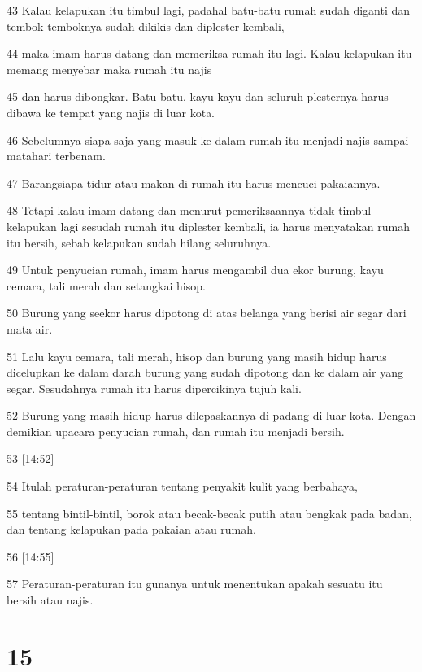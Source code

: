 \par 43 Kalau kelapukan itu timbul lagi, padahal batu-batu rumah sudah diganti dan tembok-temboknya sudah dikikis dan diplester kembali,
\par 44 maka imam harus datang dan memeriksa rumah itu lagi. Kalau kelapukan itu memang menyebar maka rumah itu najis
\par 45 dan harus dibongkar. Batu-batu, kayu-kayu dan seluruh plesternya harus dibawa ke tempat yang najis di luar kota.
\par 46 Sebelumnya siapa saja yang masuk ke dalam rumah itu menjadi najis sampai matahari terbenam.
\par 47 Barangsiapa tidur atau makan di rumah itu harus mencuci pakaiannya.
\par 48 Tetapi kalau imam datang dan menurut pemeriksaannya tidak timbul kelapukan lagi sesudah rumah itu diplester kembali, ia harus menyatakan rumah itu bersih, sebab kelapukan sudah hilang seluruhnya.
\par 49 Untuk penyucian rumah, imam harus mengambil dua ekor burung, kayu cemara, tali merah dan setangkai hisop.
\par 50 Burung yang seekor harus dipotong di atas belanga yang berisi air segar dari mata air.
\par 51 Lalu kayu cemara, tali merah, hisop dan burung yang masih hidup harus dicelupkan ke dalam darah burung yang sudah dipotong dan ke dalam air yang segar. Sesudahnya rumah itu harus dipercikinya tujuh kali.
\par 52 Burung yang masih hidup harus dilepaskannya di padang di luar kota. Dengan demikian upacara penyucian rumah, dan rumah itu menjadi bersih.
\par 53 [14:52]
\par 54 Itulah peraturan-peraturan tentang penyakit kulit yang berbahaya,
\par 55 tentang bintil-bintil, borok atau becak-becak putih atau bengkak pada badan, dan tentang kelapukan pada pakaian atau rumah.
\par 56 [14:55]
\par 57 Peraturan-peraturan itu gunanya untuk menentukan apakah sesuatu itu bersih atau najis.

\chapter{15}

